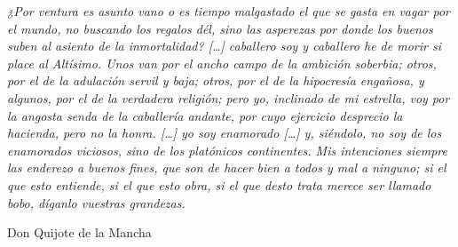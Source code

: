 \documentclass[12pt,a4paper]{book}
\theoremstyle{definition} \newtheorem{defn}[thm]{Definition}
\theoremstyle{definition} \newtheorem{ejemplo}[thm]{Example}
\theoremstyle{remark} \newtheorem{rem}[thm]{Remark}
\begin{document}
\newpage\null\thispagestyle{empty}
\newpage\null\thispagestyle{empty}
\epigraph{\textit{¿Por ventura es asunto vano o es tiempo malgastado el que se gasta en vagar por el mundo, no buscando los regalos dél, sino las
asperezas por donde los buenos suben al asiento de la inmortalidad? [\dots] caballero soy y caballero he de morir si place al Altísimo. Unos van por el
ancho campo de la ambición soberbia; otros, por el de la adulación servil y baja; otros, por el de la hipocresía engañosa, y algunos, por el de la 
verdadera religión; pero yo, inclinado de mi estrella, voy por la angosta senda de la caballería andante, por cuyo ejercicio desprecio la hacienda, pero
no la honra. [\dots] yo soy enamorado [\dots] y, siéndolo, no soy de los enamorados viciosos, sino de los platónicos continentes. Mis intenciones siempre
las enderezo a buenos fines, que son de hacer bien a todos y mal a ninguno; si el que esto entiende, si el que esto obra, si el que desto trata merece
ser llamado bobo, díganlo vuestras grandezas.}}{Don Quijote de la Mancha}

\newpage\null\thispagestyle{empty}
\tableofcontents
{}

\newpage\null\thispagestyle{empty}
\end{document}

